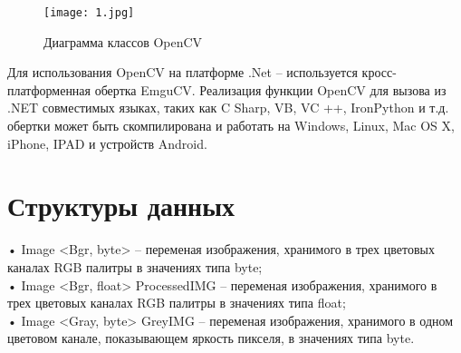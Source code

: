 \documentclass[a4paper,12pt]{article}
\begin{document}
\begin{figure}[h]
\centering
\texttt{[image: 1.jpg]}
\caption{Диаграмма классов OpenCV}
\label{fig:mpr}
\end{figure}

Для использования OpenCV на платформе .Net – используется кросс-платформенная обертка EmguCV. Реализация функции OpenCV для вызова из .NET совместимых языках, таких как C Sharp, VB, VC ++, IronPython и т.д. обертки может быть скомпилирована и работать на Windows, Linux, Mac OS X, iPhone, IPAD и устройств Android.
\newpage \section{Структуры данных}
•	Image <Bgr, byte> – переменая изображения, хранимого в трех цветовых каналах RGB палитры в значениях типа byte;
\\•	Image <Bgr, float> ProcessedIMG – переменая изображения, хранимого в трех цветовых каналах RGB палитры в значениях типа float;
\\•	Image <Gray, byte> GreyIMG – переменая изображения, хранимого в одном цветовом канале, показывающем яркость пикселя, в значениях типа byte.
\end{document}
